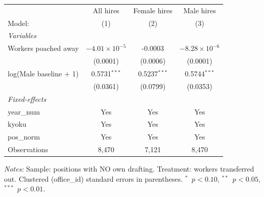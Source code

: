 \begin{table}[htbp]
\begin{threeparttable}
\begin{tabular}{lccc}
                          & All hires              & Female hires             & Male hires \\   
   Model:                 & (1)                    & (2)                      & (3)\\  
   \midrule
   \emph{Variables}\\
   Workers poached away   & $-4.01\times 10^{-5}$  & -0.0003                  & $-8.28\times 10^{-6}$\\    
                          & (0.0001)               & (0.0006)                 & (0.0001)\\   
   log(Male baseline + 1) & 0.5731$^{***}$         & 0.5237$^{***}$           & 0.5744$^{***}$\\   
                          & (0.0361)               & (0.0799)                 & (0.0353)\\   
   \midrule
   \emph{Fixed-effects}\\
   year\_num              & Yes                    & Yes                      & Yes\\  
   kyoku                  & Yes                    & Yes                      & Yes\\  
   pos\_norm              & Yes                    & Yes                      & Yes\\  
   \midrule
   Observations           & 8,470                  & 7,121                    & 8,470\\  
   \midrule \midrule
\end{tabular}
\par\endgroup
\begin{tablenotes}[flushleft]
\footnotesize
\item \textit{Notes:} Sample: positions with NO own drafting. Treatment: workers transferred out. Clustered (office\_id) standard errors in parentheses. $^{*}$~$p<0.10$, $^{**}$~$p<0.05$, $^{***}$~$p<0.01$.
\end{tablenotes}
\end{threeparttable}
\end{table}

